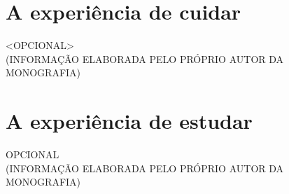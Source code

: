 \apendices

\chapter{A experiência de cuidar}
<OPCIONAL>\\
(INFORMAÇÃO ELABORADA PELO PRÓPRIO AUTOR DA MONOGRAFIA)

\chapter{A experiência de estudar}
OPCIONAL\\
(INFORMAÇÃO ELABORADA PELO PRÓPRIO AUTOR DA MONOGRAFIA)
